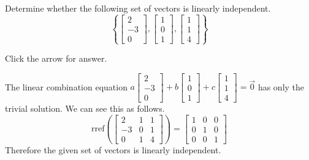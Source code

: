 \documentclass{ximera}
\begin{document}
\begin{problem}\label{prb:sovedCh2_1}
Determine whether the following set of vectors is linearly independent.
$$\left\{\begin{bmatrix}
    2\\ -3\\0
\end{bmatrix}, \begin{bmatrix}
    1\\0\\1
\end{bmatrix}, \begin{bmatrix}
    1\\1\\4
\end{bmatrix}\right\}$$

Click the arrow for answer.

\begin{expandable}{}{}
    The linear combination equation $a\begin{bmatrix}
    2\\ -3\\0
\end{bmatrix}+ b\begin{bmatrix}
    1\\0\\1
\end{bmatrix}+ c\begin{bmatrix}
    1\\1\\4
\end{bmatrix}=\vec{0}$ has only the trivial solution.  We can see this as follows.
$$\text{rref}\left(\begin{bmatrix}2 & 1 & 1\\-3 & 0 & 1\\0 & 1 & 4\end{bmatrix}\right)=\begin{bmatrix}
    1 & 0 & 0\\0 & 1 &0\\ 0 & 0 &1
\end{bmatrix}$$
Therefore the given set of vectors is linearly independent.
\end{expandable}
\end{problem}
\end{document}
